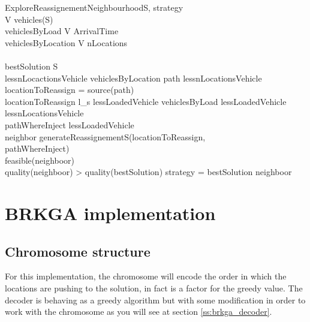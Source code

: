 \documentclass[]{report}
\begin{document}
\begin{pseudocode}{ExploreReassignementNeighbourhood}{S, strategy}
\label{pc:reassignement_neighbourhood}
	\\
	V \GETS vehicles(S)\\
	vehiclesByLoad \GETS {} V  ArrivalTime \\
	vehiclesByLocation \GETS {} V  nLocations \\
	\\
	bestSolution \GETS S\\
	\FOREACH lessnLocactionsVehicle \in vehiclesByLocation \DO
	\BEGIN
		\FOREACH path \in lessnLocationsVehicle \DO
		\BEGIN
			locationToReassign = source(path)\\
			\IF locationToReassign \neq l_{s} \THEN
			\BEGIN
				\FOREACH lessLoadedVehicle \in vehiclesByLoad \DO
					\IF lessLoadedVehicle \neq lessnLocationsVehicle \THEN
					\BEGIN
						\\
						\FOREACH pathWhereInject \in lessLoadedVehicle \DO
						\BEGIN
							\\
							neighbor \GETS generateReassignementS(locationToReassign,\\
							\quad \quad \quad \quad pathWhereInject)\\
							\IF feasible(neighboor) \AND \\
							\quad \quad \quad \quad quality(neighboor) > quality(bestSolution) \THEN
							\BEGIN
								\IF strategy =  \THEN
								\ELSE
									bestSolution \GETS neighboor\\
							\END
						\END
					\END
			\END
		\END
	\END
\end{pseudocode}

\section{BRKGA implementation}

\subsection{Chromosome structure}

For this implementation, the chromosome will encode the order in which the locations are pushing to the solution, in fact is a factor for the greedy value. The decoder is behaving as a greedy algorithm but with some modification in order to work with the chromosome as you will see at section  \ref{ss:brkga_decoder}.
\end{document}
